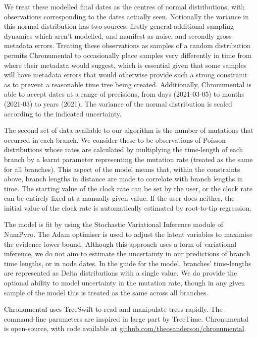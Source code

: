 We treat these modelled final dates as the centres of normal distributions, with observations corresponding to the dates actually seen. Notionally the variance in this normal distribution has two sources: firstly general additional sampling dynamics which aren't modelled, and manifest as noise, and secondly gross metadata errors. Treating these observations as samples of a random distribution permits Chronumental to occasionally place samples very differently in time from where their metadata would suggest, which is essential given that some samples will have metadata errors that would otherwise provide such a strong constraint as to prevent a reasonable time tree being created. Additionally, Chronumental is able to accept dates at a range of precisions, from days (2021-03-05) to months (2021-03) to years (2021). The variance of the normal distribution is scaled according to the indicated uncertainty.

The second set of data available to our algorithm is the number of mutations that occurred in each branch. We consider these to be observations of Poisson distributions whose rates are calculated by multiplying the time-length of each branch by a learnt parameter representing the mutation rate (treated as the same for all branches). This aspect of the model means that, within the constraints above, branch lengths in distance are made to correlate with branch lengths in time. The starting value of the clock rate can be set by the user, or the clock rate can be entirely fixed at a manually given value. If the user does neither, the initial value of the clock rate is automatically estimated by root-to-tip regression.

The model is fit by using the Stochastic Variational Inference module of NumPyro. The Adam optimiser is used to adjust the latent variables to maximise the evidence lower bound. Although this approach uses a form of variational inference, we do not aim to estimate the uncertainty in our predictions of branch time lengths, or in node dates. In the guide for the model, branches' time-lengths are represented as Delta distributions with a single value. We do provide the optional ability to model uncertainty in the mutation rate, though in any given sample of the model this is treated as the same across all branches.

Chronumental uses TreeSwift \citep{treeswift} to read and manipulate trees rapidly. The command-line parameters are inspired in large part by TreeTime. Chronumental is open-source, with code available at \url{github.com/theosanderson/chronumental}.


